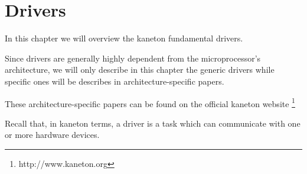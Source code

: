 
%
%

\chapter{Drivers}

In this chapter we will overview the kaneton fundamental drivers.

Since drivers are generally highly dependent from the microprocessor's
architecture, we will only describe in this chapter the generic drivers
while specific ones will be describes in architecture-specific papers.

These architecture-specific papers can be found on the official kaneton
website
  \footnote{http://www.kaneton.org}

\newpage

%
%

Recall that, in kaneton terms, a driver is a task which can communicate
with one or more hardware devices.
